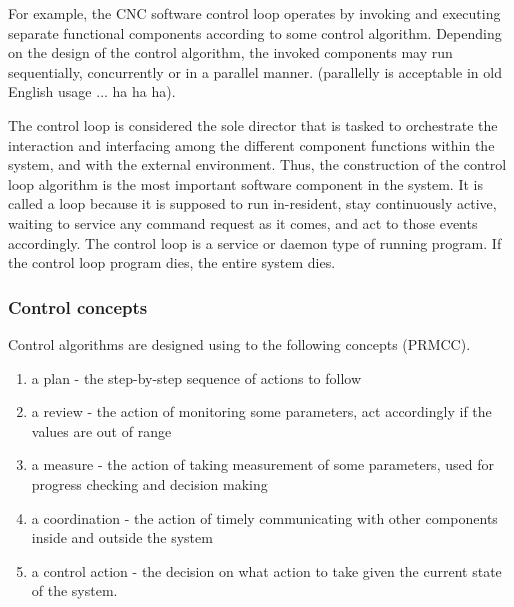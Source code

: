 For example, the CNC software control loop operates by invoking and executing separate functional components according to some control algorithm. Depending on the design of the control algorithm, the invoked components may run sequentially,  concurrently or in a parallel manner. (parallelly is acceptable in old English usage ... ha ha ha). 
\vspace*{1\baselineskip}

The control loop is considered the sole director that is tasked to orchestrate the interaction and interfacing among the different component functions within the system, and with the external environment. Thus, the construction of the control loop algorithm is the most important software component in the system. It is called a loop because it is supposed to run in-resident, stay continuously active, waiting to service any command request as it comes, and act to those events accordingly. The control loop is a service or daemon type of running program. If the control loop program dies, the entire system dies.

\subsubsection{Control concepts}    

Control algorithms are designed using to the following concepts (PRMCC).

\begin{enumerate}
	\item a plan - the step-by-step sequence of actions to follow
	
	\item a review - the action of monitoring some parameters, act accordingly if the values are out of range   
	
	\item a measure - the action of taking measurement of some parameters, used for progress checking and decision making
	
	\item a coordination - the action of timely communicating with other components inside and outside the system 
	
	\item a control action - the decision on what action to take given the current state of the system.
\end{enumerate}

